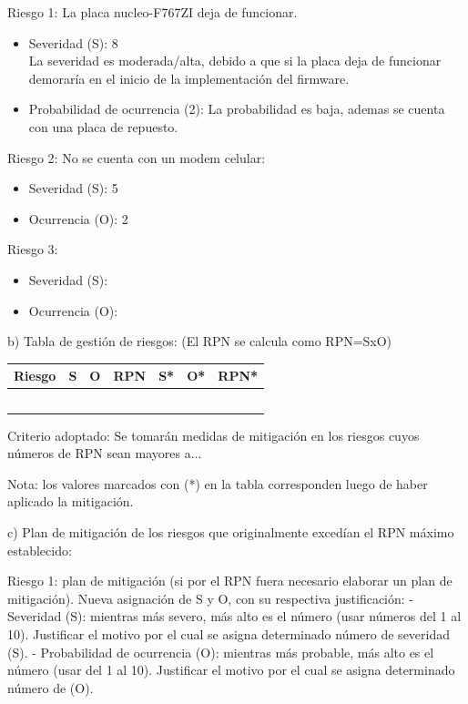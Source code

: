 \documentclass[
11pt, %
]{charter}
\begin{document}
Riesgo 1: La placa nucleo-F767ZI deja de funcionar.
\begin{itemize}
	\item Severidad (S): 8\\
	La severidad es moderada/alta, debido a que si la placa deja de funcionar demoraría en el inicio de la implementación del firmware.
	\item Probabilidad de ocurrencia (2): La probabilidad es baja, ademas se cuenta con una placa de repuesto. 
\end{itemize}   
Riesgo 2: No se cuenta con un modem celular: 
\begin{itemize}
	\item Severidad (S): 5 
	\item Ocurrencia (O): 2
\end{itemize}

Riesgo 3:
\begin{itemize}
	\item Severidad (S): 
	\item Ocurrencia (O):
\end{itemize}


b) Tabla de gestión de riesgos:      (El RPN se calcula como RPN=SxO)

\begin{table}[htpb]
\centering
\begin{tabularx}{\linewidth}{@{}|X|c|c|c|c|c|c|@{}}
\hline
\rowcolor[HTML]{C0C0C0} 
Riesgo & S & O & RPN & S* & O* & RPN* \\ \hline
       &   &   &     &    &    &      \\ \hline
       &   &   &     &    &    &      \\ \hline
       &   &   &     &    &    &      \\ \hline
       &   &   &     &    &    &      \\ \hline
       &   &   &     &    &    &      \\ \hline
\end{tabularx}%
\end{table}

Criterio adoptado: 
Se tomarán medidas de mitigación en los riesgos cuyos números de RPN sean mayores a...

Nota: los valores marcados con (*) en la tabla corresponden luego de haber aplicado la mitigación.

c) Plan de mitigación de los riesgos que originalmente excedían el RPN máximo establecido:
 
Riesgo 1: plan de mitigación (si por el RPN fuera necesario elaborar un plan de mitigación).
  Nueva asignación de S y O, con su respectiva justificación:
  - Severidad (S): mientras más severo, más alto es el número (usar números del 1 al 10).
          Justificar el motivo por el cual se asigna determinado número de severidad (S).
  - Probabilidad de ocurrencia (O): mientras más probable, más alto es el número (usar del 1 al 10).
          Justificar el motivo por el cual se asigna determinado número de (O).
\end{document}
